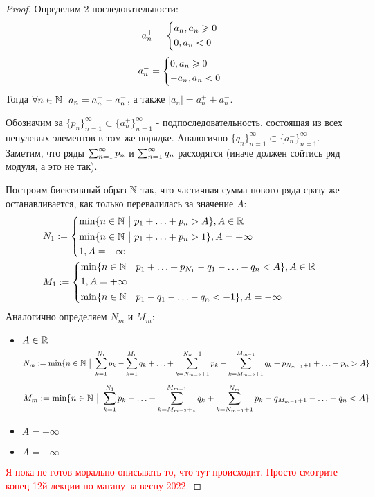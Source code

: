 \begin{proof}
	Определим 2 последовательности:
	\[
		a^+_n = \left\{\begin{aligned}
			&{a_n, a_n \geqslant 0}
			\\
			&{0, a_n < 0}
		\end{aligned}\right.
	\]
	\[
		a^-_n = \left\{\begin{aligned}
			&{0, a_n \geqslant 0}
			\\
			&{-a_n, a_n < 0}
		\end{aligned}\right.
	\]
	Тогда $\forall n \in \N\ \ a_n = a^+_n - a^-_n$, а также $|a_n| = a^+_n + a^-_n$.
	
	Обозначим за $\{p_n\}_{n = 1}^\infty \subset \{a^+_n\}_{n = 1}^\infty$ - подпоследовательность, состоящая из всех ненулевых элементов в том же порядке. Аналогично $\{q_n\}_{n = 1}^\infty \subset \{a^-_n\}_{n = 1}^\infty$. Заметим, что ряды $\sum_{n = 1}^\infty p_n$ и $\sum_{n = 1}^\infty q_n$ расходятся (иначе должен сойтись ряд модуля, а это не так).
	
	Построим биективный образ $\mathbb{N}$ так, что частичная сумма нового ряда сразу же останавливается, как только перевалилась за значение $A$:
	\begin{align*}
		&{N_1 := \left\{\begin{aligned}
			&{\min \{n \in \mathbb{N} \ \big|\  p_1 + \ldots + p_n > A\}, A \in \mathbb{R}}
			\\
			&{\min \{n \in \mathbb{N} \ \big|\  p_1 + \ldots + p_n > 1\}, A = +\infty}
			\\
			&{1, A = -\infty}
		\end{aligned}\right.}
		\\
		&{M_1 := \left\{\begin{aligned}
				&{\min \{n \in \mathbb{N} \ \big|\  p_1 + \ldots + p_{N_1} - q_1 - \ldots - q_n < A\}, A \in \mathbb{R}}
				\\
				&{1, A = +\infty}
				\\
				&{\min \{n \in \mathbb{N} \ \big|\  p_1 - q_1 - \ldots - q_n < -1\}, A = -\infty}
		\end{aligned}\right.}
	\end{align*}
	Аналогично определяем $N_m$ и $M_m$:
	\begin{itemize}
		\item $A \in \mathbb{R}$
		\[
			N_m := \min \{n \in \mathbb{N} \ \big|\  \sum\limits_{k = 1}^{N_1} p_k - \sum\limits_{k = 1}^{M_1} q_k + \ldots + \sum\limits_{k = N_{m - 2} + 1}^{N_m - 1} p_k - \sum\limits_{k = M_{m - 2} + 1}^{M_{m - 1}} q_k + p_{N_{m - 1} + 1} + \ldots + p_n > A\}
		\]
		\[
			M_m := \min \{n \in \mathbb{N} \ \big|\  \sum\limits_{k = 1}^{N_1} p_k - \ldots - \sum\limits_{k = M_{m - 2} + 1}^{M_{m - 1}} q_k + \sum\limits_{k = N_{m - 1} + 1}^{N_m} p_k - q_{M_{m - 1} + 1} - \ldots - q_n < A\}
		\]
		
		\item $A = +\infty$
		
		
		\item $A = -\infty$
		
	\end{itemize}

	\textcolor{red}{Я пока не готов морально описывать то, что тут происходит. Просто смотрите конец 12й лекции по матану за весну 2022.}
\end{proof}